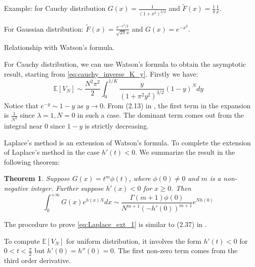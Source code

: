 \documentclass{article}
\newtheorem{theorem}{Theorem}
\def\E{\mathbb{E}}
\begin{document}
Example: for Cauchy distribution $G(x)=\frac{1}{(1+x^2)^{3/2}}$
and $\widetilde{F}(x)
= \frac{1}{\pi} \frac{1}{x}$.

For Gaussian distribution:
$\widetilde{F}(x)=\frac{e^{-x^2/2}}{\sqrt{2\pi}x}$
and $G(x)=e^{-x^2}$.

Relationship with Watson's formula.

For Cauchy distribution, we can use Watson's formula
to obtain the asymptotic result, starting from
\eqref{eq:cauchy_inverse_K_y}.
Firstly we have:
\begin{equation}
    \E[V_N] \sim \frac{N^2 \pi^2}{2}\int_{0}^{1/K}
    \frac{y}{(1+\pi^2 y^2)^{3/2}}
    \left(1-y\right)^{N}dy
\end{equation}
Notice that $e^{-y} \sim 1-y$ as $y\to 0$.
From (2.13) in \cite{murray2012asymptotic},
the first term in the expansion is $\frac{1}{N^2}$
since $\lambda=1, N=0$ in such a case. The dominant term
comes out from the integral near 0 since $1-y$ is strictly
decreasing.

Laplace's method is an extension of Watson's formula.
To complete the extension of Laplace's method in the case $h'(t)<0$.
We summarize the result in the following theorem:
\begin{theorem}
Suppose $G(x) = t^{m} \phi(t)$, where $\phi(0)\neq 0$
and $m$ is a non-negative integer.
Further suppose $h'(x)<0$ for $x\geq 0$.
Then
\begin{equation}\label{eq:Laplace_ext_1}
    \int_0^{+\infty} G(x) e^{h(x)N} dx
    \sim \frac{\Gamma(m+1) \phi(0)}{N^{m+1} (-h'(0))^{m+1}}  e^{Nh(0)}     
\end{equation}
\end{theorem}
The procedure to prove
\eqref{eq:Laplace_ext_1} is similar to (2.37)
in \cite{murray2012asymptotic}.

To compute $\E[V_N]$ for uniform distribution,
it involves the form $h'(t)<0$ for $0<t<\frac{\pi}{2}$
but $h'(0)=h''(0)=0$. The first non-zero term comes from
the third order derivative.
\end{document}
